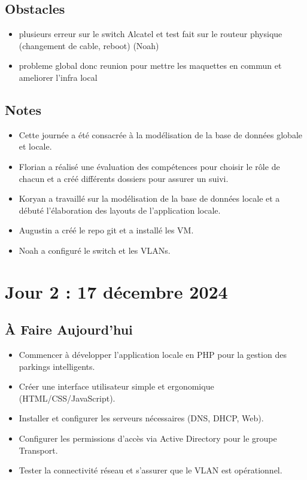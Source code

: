 \documentclass[a4paper,12pt]{report}
\begin{document}
\subsection{Obstacles}

\begin{itemize}
    \item plusieurs erreur sur le switch Alcatel et test fait sur le routeur physique (changement de cable, reboot) (Noah)
    \item probleme global donc reunion pour mettre les maquettes en commun et ameliorer l'infra local
\end{itemize}

\subsection{Notes}
\begin{itemize}
    \item Cette journée a été consacrée à la modélisation de la base de données globale et locale.
    \item Florian a réalisé une évaluation des compétences pour choisir le rôle de chacun et a créé différents dossiers pour assurer un suivi.
    \item Koryan a travaillé sur la modélisation de la base de données locale et a débuté l’élaboration des layouts de l’application locale.
    \item Augustin a créé le repo git et a installé les VM.
    \item Noah a configuré le switch et les VLANs.
\end{itemize}

\section{Jour 2 : 17 décembre 2024}

\subsection{À Faire Aujourd'hui}
\begin{itemize}
    \item Commencer à développer l'application locale en PHP pour la gestion des parkings intelligents.
    \item Créer une interface utilisateur simple et ergonomique (HTML/CSS/JavaScript).
    \item Installer et configurer les serveurs nécessaires (DNS, DHCP, Web).
    \item Configurer les permissions d'accès via Active Directory pour le groupe Transport.
    \item Tester la connectivité réseau et s'assurer que le VLAN est opérationnel.
\end{itemize}
\end{document}
